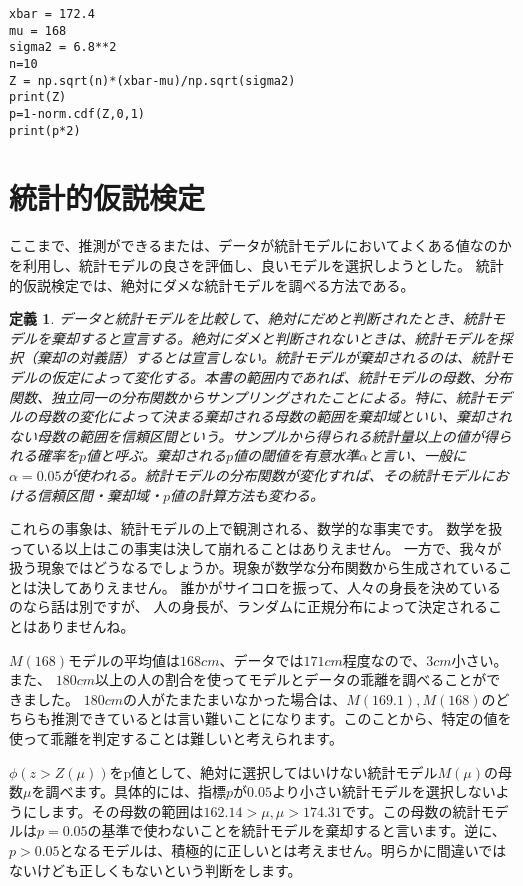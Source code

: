 \documentclass[a4paper,11pt,dvipdfmx]{jsarticle}
\newtheorem{defi}{定義}[section]
\begin{document}
\begin{lstlisting}
xbar = 172.4
mu = 168
sigma2 = 6.8**2
n=10
Z = np.sqrt(n)*(xbar-mu)/np.sqrt(sigma2)
print(Z)
p=1-norm.cdf(Z,0,1)
print(p*2)
\end{lstlisting}


\section{統計的仮説検定}
ここまで、推測ができるまたは、データが統計モデルにおいてよくある値なのかを利用し、統計モデルの良さを評価し、良いモデルを選択しようとした。
統計的仮説検定では、絶対にダメな統計モデルを調べる方法である。
\begin{defi}
    データと統計モデルを比較して、絶対にだめと判断されたとき、統計モデルを棄却すると宣言する。絶対にダメと判断されないときは、統計モデルを採択（棄却の対義語）するとは宣言しない。統計モデルが棄却されるのは、統計モデルの仮定によって変化する。本書の範囲内であれば、統計モデルの母数、分布関数、独立同一の分布関数からサンプリングされたことによる。特に、統計モデルの母数の変化によって決まる棄却される母数の範囲を棄却域といい、棄却されない母数の範囲を信頼区間という。サンプルから得られる統計量以上の値が得られる確率を$p$値と呼ぶ。棄却される$p$値の閾値を有意水準$\alpha$と言い、一般に$\alpha=0.05$が使われる。統計モデルの分布関数が変化すれば、その統計モデルにおける信頼区間・棄却域・$p$値の計算方法も変わる。
\end{defi}

これらの事象は、統計モデルの上で観測される、数学的な事実です。
数学を扱っている以上はこの事実は決して崩れることはありえません。
一方で、我々が扱う現象ではどうなるでしょうか。現象が数学な分布関数から生成されていることは決してありえません。
誰かがサイコロを振って、人々の身長を決めているのなら話は別ですが、
人の身長が、ランダムに正規分布によって決定されることはありませんね。

$M(168)$モデルの平均値は$168cm$、データでは$171cm$程度なので、$3cm$小さい。また、
$180cm$以上の人の割合を使ってモデルとデータの乖離を調べることができました。
$180cm$の人がたまたまいなかった場合は、$M(169.1),M(168)$のどちらも推測できているとは言い難いことになります。このことから、特定の値を使って乖離を判定することは難しいと考えられます。


$\phi(z>Z(\mu))を$p値として、絶対に選択してはいけない統計モデル$M(\mu)$の母数$\mu$を調べます。具体的には、指標$p$が$0.05$より小さい統計モデルを選択しないようにします。その母数の範囲は$162.14 >\mu, \mu > 174.31$です。この母数の統計モデルは$p=0.05$の基準で使わないことを統計モデルを棄却すると言います。逆に、$p>0.05$となるモデルは、積極的に正しいとは考えません。明らかに間違いではないけども正しくもないという判断をします。
\end{document}
